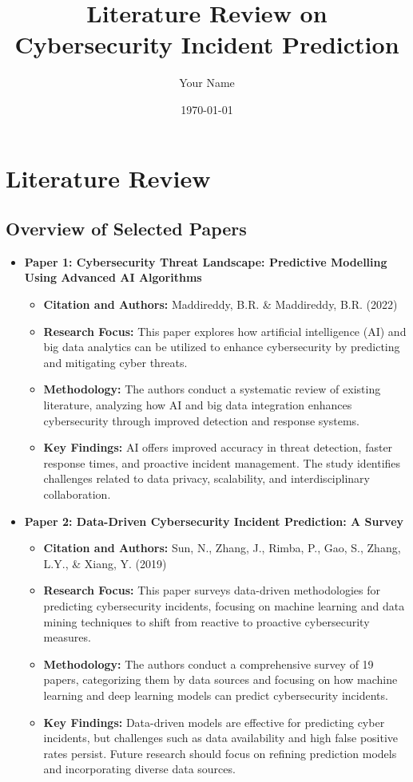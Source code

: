 \documentclass[12pt]{article}
\title{Literature Review on Cybersecurity Incident Prediction}
\author{Your Name}
\date{\today}
\begin{document}
\maketitle

\section{Literature Review}

\subsection{Overview of Selected Papers}

\begin{itemize}
    \item \textbf{Paper 1: Cybersecurity Threat Landscape: Predictive Modelling Using Advanced AI Algorithms}
    \begin{itemize}
        \item \textbf{Citation and Authors:} Maddireddy, B.R. \& Maddireddy, B.R. (2022)
        \item \textbf{Research Focus:} This paper explores how artificial intelligence (AI) and big data analytics can be utilized to enhance cybersecurity by predicting and mitigating cyber threats.
        \item \textbf{Methodology:} The authors conduct a systematic review of existing literature, analyzing how AI and big data integration enhances cybersecurity through improved detection and response systems.
        \item \textbf{Key Findings:} AI offers improved accuracy in threat detection, faster response times, and proactive incident management. The study identifies challenges related to data privacy, scalability, and interdisciplinary collaboration.
    \end{itemize}
    
    \vspace{0.2cm}
    
    \item \textbf{Paper 2: Data-Driven Cybersecurity Incident Prediction: A Survey}
    \begin{itemize}
        \item \textbf{Citation and Authors:} Sun, N., Zhang, J., Rimba, P., Gao, S., Zhang, L.Y., \& Xiang, Y. (2019)
        \item \textbf{Research Focus:} This paper surveys data-driven methodologies for predicting cybersecurity incidents, focusing on machine learning and data mining techniques to shift from reactive to proactive cybersecurity measures.
        \item \textbf{Methodology:} The authors conduct a comprehensive survey of 19 papers, categorizing them by data sources and focusing on how machine learning and deep learning models can predict cybersecurity incidents.
        \item \textbf{Key Findings:} Data-driven models are effective for predicting cyber incidents, but challenges such as data availability and high false positive rates persist. Future research should focus on refining prediction models and incorporating diverse data sources.
    \end{itemize}
    

\end{itemize}
\end{document}
